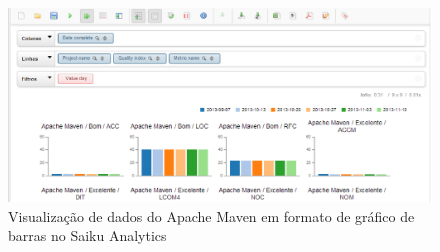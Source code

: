 \begin{figure}[ht!]
\includegraphics[keepaspectratio=false,scale=0.63]{figuras/indicadores_graficos.eps}
\caption{Visualização de dados do Apache Maven em formato de gráfico de barras no Saiku Analytics}
\label{chart}
\end{figure}
\FloatBarrier
 
